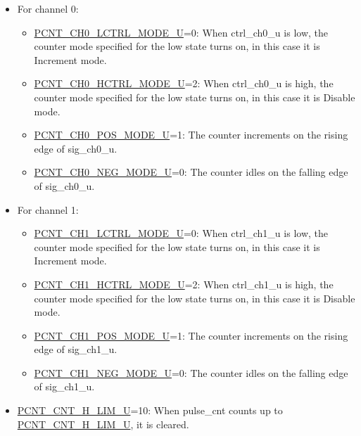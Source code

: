 \documentclass[main\_\_EN.tex]{subfiles}
\begin{document}
\begin{itemize}
    \item For channel 0:
    \begin{itemize}
        \item \hyperref[fielddesc:PCNTCH0LCTRLMODEUN]{PCNT\_CH0\_LCTRL\_MODE\_U}=0: When ctrl\_ch0\_u is low, the counter mode specified for the low state turns on, in this case it is Increment mode.

        \item \hyperref[fielddesc:PCNTCH0HCTRLMODEUN]{PCNT\_CH0\_HCTRL\_MODE\_U}=2: When ctrl\_ch0\_u is high, the counter mode specified for the low state turns on, in this case it is Disable mode.

        \item \hyperref[fielddesc:PCNTCH0POSMODEUN]{PCNT\_CH0\_POS\_MODE\_U}=1: The counter increments on the rising edge of sig\_ch0\_u.

        \item \hyperref[fielddesc:PCNTCH0NEGMODEUN]{PCNT\_CH0\_NEG\_MODE\_U}=0: The counter idles on the falling edge of sig\_ch0\_u.

    \end{itemize}

    \item For channel 1:
    \begin{itemize}
        \item \hyperref[fielddesc:PCNTCH1LCTRLMODEUN]{PCNT\_CH1\_LCTRL\_MODE\_U}=0: When ctrl\_ch1\_u is low, the counter mode specified for the low state turns on, in this case it is Increment mode.

        \item \hyperref[fielddesc:PCNTCH1HCTRLMODEUN]{PCNT\_CH1\_HCTRL\_MODE\_U}=2: When ctrl\_ch1\_u is high, the counter mode specified for the low state turns on, in this case it is Disable mode.

        \item \hyperref[fielddesc:PCNTCH1POSMODEUN]{PCNT\_CH1\_POS\_MODE\_U}=1: The counter increments on the rising edge of sig\_ch1\_u.

        \item \hyperref[fielddesc:PCNTCH1NEGMODEUN]{PCNT\_CH1\_NEG\_MODE\_U}=0: The counter idles on the falling edge of sig\_ch1\_u.

    \end{itemize}

    \item \hyperref[fielddesc:PCNTCNTHLIMUN]{PCNT\_CNT\_H\_LIM\_U}=10: When pulse\_cnt counts up to \hyperref[fielddesc:PCNTCNTHLIMUN]{PCNT\_CNT\_H\_LIM\_U}, it is cleared.

\end{itemize}
\end{document}
